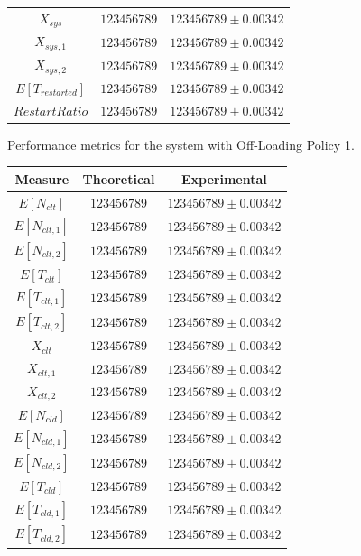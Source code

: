 \begin{figure}
\begin{center}
\begin{tabular}{|c||c|c|}
			$X_{sys}$  & $123456789$ & $123456789\pm 0.00342$ \\
			$X_{sys,1}$  & $123456789$ & $123456789\pm 0.00342$ \\
			$X_{sys,2}$  & $123456789$ & $123456789\pm 0.00342$ \\
			\hline
			$E[T_{restarted}]$  & $123456789$ & $123456789\pm 0.00342$ \\
			$RestartRatio$  & $123456789$ & $123456789\pm 0.00342$ \\			
			\hline
		\end{tabular}
	\end{center}
	\caption{Performance metrics for the system with Off-Loading Policy 1.}
	\label{tbl:evaluation-performance-metrics-1}
\end{figure}

\begin{figure}
	\begin{center}
		\begin{tabular}{|c||c|c|}
			\hline
			Measure & Theoretical & Experimental\\
			\hline
			$E[N_{clt}]$  & $123456789$ & $123456789\pm 0.00342$ \\
			$E[N_{clt,1}]$  & $123456789$ & $123456789\pm 0.00342$ \\
			$E[N_{clt,2}]$  & $123456789$ & $123456789\pm 0.00342$ \\
			$E[T_{clt}]$  & $123456789$ & $123456789\pm 0.00342$ \\
			$E[T_{clt,1}]$  & $123456789$ & $123456789\pm 0.00342$ \\
			$E[T_{clt,2}]$  & $123456789$ & $123456789\pm 0.00342$ \\
			$X_{clt}$  & $123456789$ & $123456789\pm 0.00342$ \\
			$X_{clt,1}$  & $123456789$ & $123456789\pm 0.00342$ \\
			$X_{clt,2}$  & $123456789$ & $123456789\pm 0.00342$ \\
			\hline
			$E[N_{cld}]$  & $123456789$ & $123456789\pm 0.00342$ \\
			$E[N_{cld,1}]$  & $123456789$ & $123456789\pm 0.00342$ \\
			$E[N_{cld,2}]$  & $123456789$ & $123456789\pm 0.00342$ \\
			$E[T_{cld}]$  & $123456789$ & $123456789\pm 0.00342$ \\
			$E[T_{cld,1}]$  & $123456789$ & $123456789\pm 0.00342$ \\
			$E[T_{cld,2}]$  & $123456789$ & $123456789\pm 0.00342$ \\

\end{tabular}
\end{center}
\end{figure}
